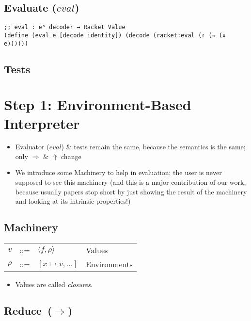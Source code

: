 \documentclass[12pt, oneside]{book}
\begin{document}
\subsection{Evaluate (\(eval\))}

\begin{Verbatim}
;; eval : eˢ decoder → Racket Value
(define (eval e [decode identity]) (decode (racket:eval (⇑ (⇒ (⇓ e))))))
\end{Verbatim}

\subsection{Tests}

\section{Step 1: Environment-Based Interpreter}

\begin{itemize}
  \item Evaluator (\(eval\)) \& tests remain the same, because the semantics is the same; only \(⇒\) \& \(⇑\) change
  \item We introduce some Machinery to help in evaluation; the user is never supposed to see this machinery (and this is a major contribution of our work, because usually papers stop short by just showing the result of the machinery and looking at its intrinsic properties!)
\end{itemize}

\subsection{Machinery}

\begin{tabular}{rcll}
  \(v\) & ::= & \(⟨f, ρ⟩\)       & Values       \\
  \(ρ\) & ::= & \([x ↦ v, ...]\) & Environments \\
\end{tabular}

\begin{itemize}
  \item Values are called \emph{closures}.
\end{itemize}

\subsection{Reduce~(\(⇒\))}
\end{document}

